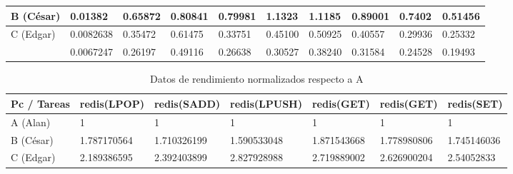 \documentclass{article}
\begin{document}
\begin{enumerate}
{\begin{table}[]
\begin{tabular}{|l|l|l|l|l|l|l|l|l|l|}
                \cellcolor[HTML]{FFFE65}{\color[HTML]{000000}}
                B (César) & 0.01382 & 0.65872 & 0.80841 & 0.79981 & 1.1323 
                & 1.1185 & 0.89001 & 0.7402 & 0.51456 \\ \hline
    
                
    
                \cellcolor[HTML]{34FF34}{\color[HTML]{000000}}
                C (Edgar) & 0.0082638 & 0.35472 & 0.61475 & 0.33751 & 0.45100 
                & 0.50925 & 0.40557 & 0.29936 & 0.25332\\ \hline
    
                
    
                \cellcolor[HTML]{9698ED}{\color[HTML]{000000} 
                D(Sandra)} & 0.0067247 & 0.26197 & 0.49116 & 0.26638 & 0.30527 
                & 0.38240 & 0.31584 & 0.24528 & 0.19493 \\ \hline
    
                
                \end{tabular}
            \end{table}
    
            \begin{table}[]
                \caption*{Datos de rendimiento normalizados respecto a A}
                \begin{tabular}{|l|l|l|l|l|l|l|}
                \toprule
                    Pc / Tareas 
                    & \cellcolor[HTML]{DAE8FC}redis(LPOP) 
                    & \cellcolor[HTML]{DAE8FC}redis(SADD) 
                    & \cellcolor[HTML]{DAE8FC}redis(LPUSH) 
                    & \cellcolor[HTML]{DAE8FC}redis(GET)
                    & \cellcolor[HTML]{DAE8FC}redis(GET)
                    & \cellcolor[HTML]{DAE8FC}redis(SET) \\ \hline
    
                    \cellcolor[HTML]{F8A102}{\color[HTML]{000000}} 
                    A (Alan) & 1 & 1 & 1 & 1 & 1 & 1 \\ \hline
    
                    \cellcolor[HTML]{FFFE65}{\color[HTML]{000000}}
                    B (César) & 1.787170564 & 1.710326199 & 1.590533048 
                    & 1.871543668 & 1.778980806 & 1.745146036\\ \hline
    
    
                    \cellcolor[HTML]{34FF34}{\color[HTML]{000000}} 
                    C (Edgar) & 2.189386595 & 2.392403899 & 2.827928988 
                    & 2.719889002 & 2.626900204 & 2.54052833\\ \hline
    

\end{tabular}
\end{table}}
\end{enumerate}
\end{document}
